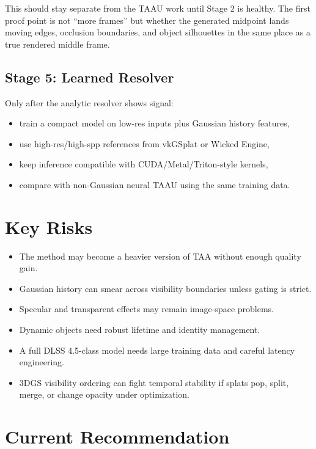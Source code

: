 \documentclass[11pt]{article}
\begin{document}
This should stay separate from the TAAU work until Stage 2 is healthy. The
first proof point is not ``more frames'' but whether the generated midpoint
lands moving edges, occlusion boundaries, and object silhouettes in the same
place as a true rendered middle frame.

\subsection{Stage 5: Learned Resolver}

Only after the analytic resolver shows signal:

\begin{itemize}
  \item train a compact model on low-res inputs plus Gaussian history features,
  \item use high-res/high-spp references from vkGSplat or Wicked Engine,
  \item keep inference compatible with CUDA/Metal/Triton-style kernels,
  \item compare with non-Gaussian neural TAAU using the same training data.
\end{itemize}

\section{Key Risks}

\begin{itemize}
  \item The method may become a heavier version of TAA without enough quality
        gain.
  \item Gaussian history can smear across visibility boundaries unless gating
        is strict.
  \item Specular and transparent effects may remain image-space problems.
  \item Dynamic objects need robust lifetime and identity management.
  \item A full DLSS 4.5-class model needs large training data and careful
        latency engineering.
  \item 3DGS visibility ordering can fight temporal stability if splats pop,
        split, merge, or change opacity under optimization.
\end{itemize}

\section{Current Recommendation}
\end{document}
